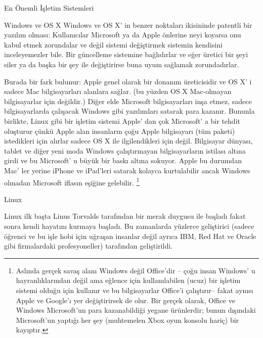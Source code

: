 \documentclass[10pt,a5paper]{book}
\begin{document}
\begin{section}{En Önemli İşletim Sistemleri}
\begin{subsection}{Windows ve OS X}
Windows ve OS X' in benzer noktaları ikisininde patentli bir yazılım olması: Kullanıcılar Microsoft ya da Apple önlerine neyi koyarsa onu kabul etmek zorundalar ve değil sistemi değiştirmek sistemin kendisini inceleyemezler bile. Bir güncelleme sistemine bağlıdırlar ve eğer üretici bir şeyi siler ya da başka bir şey ile değiştirirse buna uyum sağlamak zorundadırlar.

Burada bir fark bulunur: Apple genel olarak bir donanım üreticisidir ve OS X' i sadece Mac bilgisayarları alanlara sağlar. (bu yüzden OS X Mac-olmayan bilgisayarlar için değildir.) Diğer elde Microsoft bilgisayarları inşa etmez, sadece bilgisayarlarda çalışacak Windows gibi yazılımları satarak para kazanır. Bununla birlikte, Linux gibi bir işletim sistemi Apple' dan çok Microsoft' a bir tehdit oluşturur çünkü Apple alan insanların çoğu Apple bilgisayarı (tüm paketi) istedikleri için alırlar sadece OS X ile ilgilendikleri için değil. Bilgisayar dünyası, tablet ve diğer yeni moda Windows çalıştırmayan bilgisayarların istilası altına girdi ve bu Microsoft' u büyük bir baskı altına sokuyor. Apple bu durumdan Mac' ler yerine iPhone ve iPad'leri satarak kolayca kurtulabilir ancak Windows olmadan Microsoft iflasın eşiğine gelebilir.
\footnote{Aslında gerçek savaş alanı Windows değil Office'dir – çoğu insan Windows' u hayranlıklarından değil ama eğlence için kullanılabilen (ucuz) bir işletim sistemi olduğu için kullanır ve bu bilgisayarlar Office'i çalıştırır-- fakat aynısı Apple ve Google'ı yer değiştirirsek de olur. Bir gerçek olarak, Office ve Windows Microsoft'un para kazanabildiği yegane ürünlerdir; bunun dışındaki Microsoft'un yaptığı her şey (muhtemelen Xbox oyun konsolu hariç) bir kayıptır.}
\end{subsection}
\begin{subsection}{Linux}

Linux ilk başta Linus Torvalds tarafından bir merak duygusu ile başladı fakat sonra kendi hayatını kurmaya başladı. Bu zamanlarda yüzlerce geliştirici (sadece öğrenci ve bu işle hobi için uğraşan insanlar değil ayrıca IBM, Red Hat ve Oracle gibi firmalardaki profesyoneller) tarafından geliştirildi.


\end{subsection}
\end{section}
\end{document}
